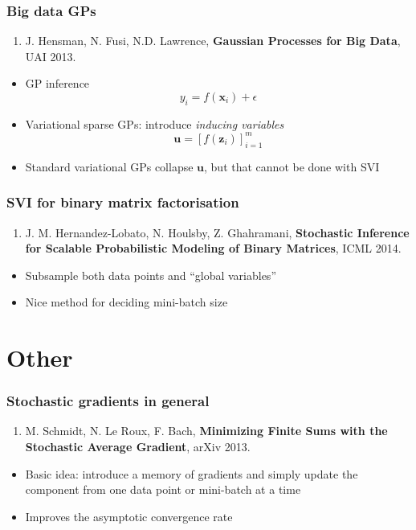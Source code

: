 \documentclass{beamer}
\newcommand{\vx}{\mathbf{x}}
\begin{document}
\begin{frame}
  \frametitle{Big data GPs}

  \begin{enumerate}
  \item J. Hensman, N. Fusi, N.D. Lawrence, \textbf{Gaussian Processes for Big Data}, UAI 2013.
  \end{enumerate}

  \begin{itemize}
  \item GP inference
    $$ y_i = f(\vx_i) + \epsilon $$
  \item Variational sparse GPs: introduce \emph{inducing variables}
    $$ \mathbf{u} = [f(\mathbf{z}_i)]_{i=1}^m $$
  \item Standard variational GPs collapse $\mathbf{u}$, but that
    cannot be done with SVI
  \end{itemize}
\end{frame}

\begin{frame}
  \frametitle{SVI for binary matrix factorisation}

  \begin{enumerate}
  \item J. M. Hernandez-Lobato, N. Houlsby, Z. Ghahramani, \textbf{Stochastic Inference for Scalable Probabilistic Modeling of Binary Matrices}, ICML 2014.
  \end{enumerate}

  \begin{itemize}
  \item Subsample both data points and ``global variables''
  \item Nice method for deciding mini-batch size
  \end{itemize}
\end{frame}

\section{Other}

\begin{frame}
  \frametitle{Stochastic gradients in general}

  \begin{enumerate}
  \item M. Schmidt, N. Le Roux, F. Bach, \textbf{Minimizing Finite Sums with the Stochastic Average Gradient}, arXiv 2013.
  \end{enumerate}
  \begin{itemize}
  \item Basic idea: introduce a memory of gradients and simply update the
    component from one data point or mini-batch at a time
  \item Improves the asymptotic convergence rate
  \end{itemize}

\end{frame}
\end{document}
